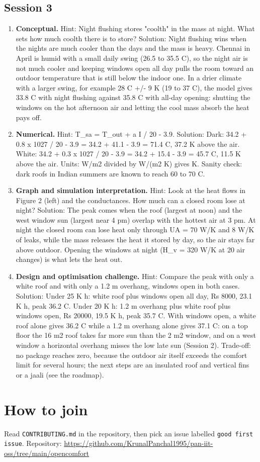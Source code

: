 \documentclass[11pt,a4paper]{article}
\begin{document}
\subsection*{Session 3}
\begin{enumerate}[nosep]
\item \textbf{Conceptual.} Hint: Night flushing stores "coolth" in the mass at night. What sets how much coolth there is to store? Solution: Night flushing wins when the nights are much cooler than the days and the mass is heavy. Chennai in April is humid with a small daily swing (26.5 to 35.5 C), so the night air is not much cooler and keeping windows open all day pulls the room toward an outdoor temperature that is still below the indoor one. In a drier climate with a larger swing, for example 28 C +/- 9 K (19 to 37 C), the model gives 33.8 C with night flushing against 35.8 C with all-day opening: shutting the windows on the hot afternoon air and letting the cool mass absorb the heat pays off.
\item \textbf{Numerical.} Hint: T\_sa = T\_out + a I / 20 - 3.9. Solution: Dark: 34.2 + 0.8 x 1027 / 20 - 3.9 = 34.2 + 41.1 - 3.9 = 71.4 C, 37.2 K above the air. White: 34.2 + 0.3 x 1027 / 20 - 3.9 = 34.2 + 15.4 - 3.9 = 45.7 C, 11.5 K above the air. Units: W/m2 divided by W/(m2 K) gives K. Sanity check: dark roofs in Indian summers are known to reach 60 to 70 C.
\item \textbf{Graph and simulation interpretation.} Hint: Look at the heat flows in Figure 2 (left) and the conductances. How much can a closed room lose at night? Solution: The peak comes when the roof (largest at noon) and the west window sun (largest near 4 pm) overlap with the hottest air at 3 pm. At night the closed room can lose heat only through UA = 70 W/K and 8 W/K of leaks, while the mass releases the heat it stored by day, so the air stays far above outdoor. Opening the windows at night (H\_v = 320 W/K at 20 air changes) is what lets the heat out.
\item \textbf{Design and optimisation challenge.} Hint: Compare the peak with only a white roof and with only a 1.2 m overhang, windows open in both cases. Solution: Under 25 K h: white roof plus windows open all day, Rs 8000, 23.1 K h, peak 36.2 C. Under 20 K h: 1.2 m overhang plus white roof plus windows open, Rs 20000, 19.5 K h, peak 35.7 C. With windows open, a white roof alone gives 36.2 C while a 1.2 m overhang alone gives 37.1 C: on a top floor the 16 m2 roof takes far more sun than the 2 m2 window, and on a west window a horizontal overhang misses the low late sun (Session 2). Trade-off: no package reaches zero, because the outdoor air itself exceeds the comfort limit for several hours; the next steps are an insulated roof and vertical fins or a jaali (see the roadmap).
\end{enumerate}

\section{How to join}
Read \texttt{CONTRIBUTING.md} in the repository, then pick an issue labelled \texttt{good first issue}. Repository: \url{https://github.com/KrunalPanchal1995/pan-iit-oss/tree/main/opencomfort}
\end{document}

